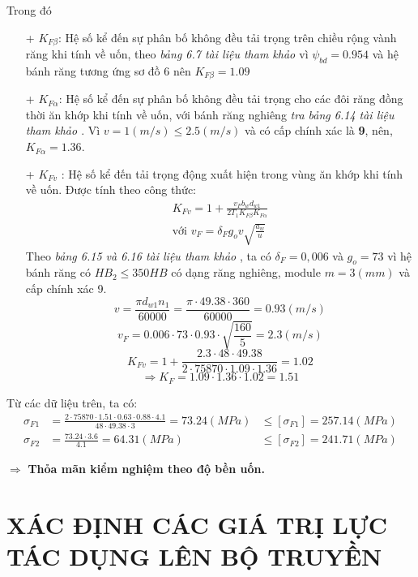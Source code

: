 \begin{itemize}
            Trong đó
            \begin{itemize}
                \item[+] $K_{F\beta}$: Hệ số kể đến sự phân bố không đều tải trọng trên chiều rộng vành răng khi tính về uốn, theo \textit{bảng 6.7 tài liệu tham khảo \cite{tltk1}} vì $\psi_{bd} = 0.954$ và hệ bánh răng tương ứng sơ đồ 6 nên $K_{F\beta} = 1.09$
                \item[+] $K_{F\alpha}$: Hệ số kể đến sự phân bố không đều tải trọng cho các đôi răng đồng thời ăn khớp khi tính về uốn, với bánh răng nghiêng \textit{tra bảng 6.14 tài liệu tham khảo \cite{tltk1}}. Vì $v = 1(m/s) \leq 2.5 (m/s)$ và có cấp chính xác là \textbf{9}, nên, $K_{F\alpha} = 1.36$.
                \item[+] $K_{Fv}$ : Hệ số kể đến tải trọng động xuất hiện trong vùng ăn khớp khi tính về uốn. Được tính theo công thức:
                \begin{align*}
                    K_{Fv} = 1 + \frac{v_Fb_wd_{w1}}{2T_1K_{F\beta}K_{F\alpha}}\\
                    \text{với }
                    v_F = \delta_Fg_ov\sqrt{\frac{a_w}{u}}
                \end{align*}
                Theo \textit{bảng 6.15 và 6.16 tài liệu tham khảo} \cite{tltk1}, ta có $\delta_F = 0,006$ và $g_o = 73$ vì hệ bánh răng có $HB_2 \leq 350 HB$ có dạng răng nghiêng, module $m = 3 (mm)$ và cấp chính xác 9.
                $$v = \frac{{\pi}d_{w1}n_1}{60000} = \frac{\pi \cdot 49.38 \cdot 360}{60000} = 0.93 (m/s) $$
                $$v_F = 0.006 \cdot 73 \cdot 0.93 \cdot \sqrt{\frac{160}{5}} = 2.3 (m/s) $$
                $$K_{Fv} = 1 + \frac{2.3 \cdot 48 \cdot 49.38}{2 \cdot 75870 \cdot 1.09 \cdot 1.36} = 1.02$$
                $$\Rightarrow K_F = 1.09 \cdot 1.36 \cdot 1.02 = 1.51$$
            \end{itemize}
            Từ các dữ liệu trên, ta có:
            \begin{align*}
            \sigma_{F1} & = \frac{2 \cdot 75870 \cdot 1.51 \cdot 0.63 \cdot 0.88 \cdot 4.1}{48 \cdot 49.38 \cdot 3} = 73.24 (MPa) & \leq [\sigma_{F1}] = 257.14 (MPa) \\
            \sigma_{F2} & = \frac{73.24 \cdot 3.6}{4.1} = 64.31 (MPa) & \leq [\sigma_{F2}] = 241.71 (MPa)
            \end{align*}    
        \end{itemize}
        $\Rightarrow$ \textbf{Thỏa mãn kiểm nghiệm theo độ bền uốn.}
    \section{XÁC ĐỊNH CÁC GIÁ TRỊ LỰC TÁC DỤNG LÊN BỘ TRUYỀN}

